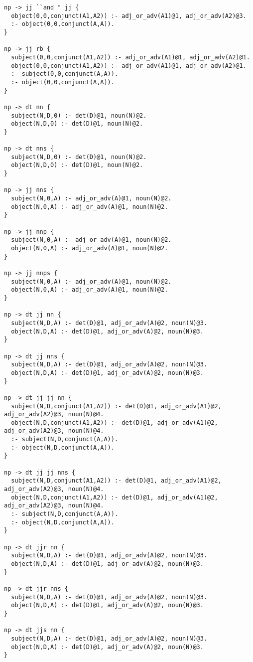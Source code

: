 \begin{lstlisting}
np -> jj ``and " jj {
  object(0,0,conjunct(A1,A2)) :- adj_or_adv(A1)@1, adj_or_adv(A2)@3.
  :- object(0,0,conjunct(A,A)).
}

np -> jj rb {
  subject(0,0,conjunct(A1,A2)) :- adj_or_adv(A1)@1, adj_or_adv(A2)@1.
  object(0,0,conjunct(A1,A2)) :- adj_or_adv(A1)@1, adj_or_adv(A2)@1.
  :- subject(0,0,conjunct(A,A)).
  :- object(0,0,conjunct(A,A)).
}

np -> dt nn {
  subject(N,D,0) :- det(D)@1, noun(N)@2.
  object(N,D,0) :- det(D)@1, noun(N)@2.
}

np -> dt nns {
  subject(N,D,0) :- det(D)@1, noun(N)@2.
  object(N,D,0) :- det(D)@1, noun(N)@2.
}

np -> jj nns {
  subject(N,0,A) :- adj_or_adv(A)@1, noun(N)@2.
  object(N,0,A) :- adj_or_adv(A)@1, noun(N)@2.
}

np -> jj nnp {
  subject(N,0,A) :- adj_or_adv(A)@1, noun(N)@2.
  object(N,0,A) :- adj_or_adv(A)@1, noun(N)@2.
}

np -> jj nnps {
  subject(N,0,A) :- adj_or_adv(A)@1, noun(N)@2.
  object(N,0,A) :- adj_or_adv(A)@1, noun(N)@2.
}

np -> dt jj nn {
  subject(N,D,A) :- det(D)@1, adj_or_adv(A)@2, noun(N)@3.
  object(N,D,A) :- det(D)@1, adj_or_adv(A)@2, noun(N)@3.
}

np -> dt jj nns {
  subject(N,D,A) :- det(D)@1, adj_or_adv(A)@2, noun(N)@3.
  object(N,D,A) :- det(D)@1, adj_or_adv(A)@2, noun(N)@3.
}

np -> dt jj jj nn {
  subject(N,D,conjunct(A1,A2)) :- det(D)@1, adj_or_adv(A1)@2, adj_or_adv(A2)@3, noun(N)@4.
  object(N,D,conjunct(A1,A2)) :- det(D)@1, adj_or_adv(A1)@2, adj_or_adv(A2)@3, noun(N)@4.
  :- subject(N,D,conjunct(A,A)).
  :- object(N,D,conjunct(A,A)).
}

np -> dt jj jj nns {
  subject(N,D,conjunct(A1,A2)) :- det(D)@1, adj_or_adv(A1)@2, adj_or_adv(A2)@3, noun(N)@4.
  object(N,D,conjunct(A1,A2)) :- det(D)@1, adj_or_adv(A1)@2, adj_or_adv(A2)@3, noun(N)@4.
  :- subject(N,D,conjunct(A,A)).
  :- object(N,D,conjunct(A,A)).
}

np -> dt jjr nn {
  subject(N,D,A) :- det(D)@1, adj_or_adv(A)@2, noun(N)@3.
  object(N,D,A) :- det(D)@1, adj_or_adv(A)@2, noun(N)@3.
}

np -> dt jjr nns {
  subject(N,D,A) :- det(D)@1, adj_or_adv(A)@2, noun(N)@3.
  object(N,D,A) :- det(D)@1, adj_or_adv(A)@2, noun(N)@3.
}

np -> dt jjs nn {
  subject(N,D,A) :- det(D)@1, adj_or_adv(A)@2, noun(N)@3.
  object(N,D,A) :- det(D)@1, adj_or_adv(A)@2, noun(N)@3.
}


\end{lstlisting}
